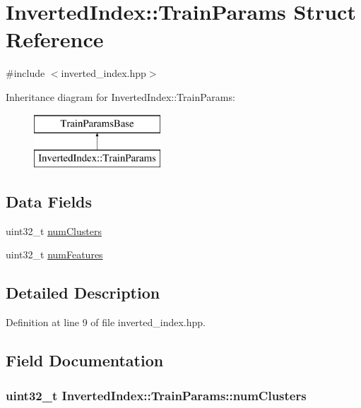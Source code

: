 \hypertarget{structInvertedIndex_1_1TrainParams}{\section{Inverted\-Index\-:\-:Train\-Params Struct Reference}
\label{structInvertedIndex_1_1TrainParams}
}


{\ttfamily \#include $<$inverted\-\_\-index.\-hpp$>$}

Inheritance diagram for Inverted\-Index\-:\-:Train\-Params\-:\begin{figure}[H]
\begin{center}
\leavevmode
\includegraphics[height=2.000000cm]{structInvertedIndex_1_1TrainParams}
\end{center}
\end{figure}
\subsection*{Data Fields}
\begin{DoxyCompactItemize}
\item 
uint32\-\_\-t \hyperlink{structInvertedIndex_1_1TrainParams_ac8680abdf1fe9c33d3c3b02e73dbf733}{num\-Clusters}
\item 
uint32\-\_\-t \hyperlink{structInvertedIndex_1_1TrainParams_a7f7dbf8745443ece0694fc79f080966b}{num\-Features}
\end{DoxyCompactItemize}


\subsection{Detailed Description}


Definition at line 9 of file inverted\-\_\-index.\-hpp.



\subsection{Field Documentation}
\hypertarget{structInvertedIndex_1_1TrainParams_ac8680abdf1fe9c33d3c3b02e73dbf733}{
\subsubsection[{num\-Clusters}]{\setlength{\rightskip}{0pt plus 5cm}uint32\-\_\-t Inverted\-Index\-::\-Train\-Params\-::num\-Clusters}}\label{structInvertedIndex_1_1TrainParams_ac8680abdf1fe9c33d3c3b02e73dbf733}


